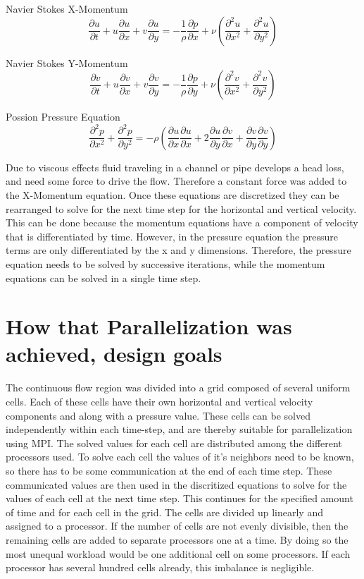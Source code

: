\documentclass[12pt]{article}
\begin{document}
Navier Stokes X-Momentum
$$\frac{\partial u}{\partial t}+u\frac{\partial u}{\partial x}+v\frac{\partial u}{\partial y}=-\frac{1}{\rho}\frac{\partial p}{\partial x}+\nu\left(\frac{\partial^2 u}{\partial x^2}+\frac{\partial^2 u}{\partial y^2}\right)$$

Navier Stokes Y-Momentum
$$\frac{\partial v}{\partial t}+u\frac{\partial v}{\partial x}+v\frac{\partial v}{\partial y}=-\frac{1}{\rho}\frac{\partial p}{\partial y}+\nu\left(\frac{\partial^2 v}{\partial x^2}+\frac{\partial^2 v}{\partial y^2}\right)$$

Possion Pressure Equation
$$\frac{\partial^2 p}{\partial x^2}+\frac{\partial^2 p}{\partial y^2}=-\rho\left(\frac{\partial u}{\partial x}\frac{\partial u}{\partial x}+2\frac{\partial u}{\partial y}\frac{\partial v}{\partial x}+\frac{\partial v}{\partial y}\frac{\partial v}{\partial y}\right)
$$

Due to viscous effects fluid traveling in a channel or pipe develops a head loss, and need some force to drive the 
flow. Therefore a constant force was added to the X-Momentum equation. Once these equations are discretized they can 
be rearranged to solve for the next time step for the horizontal and vertical velocity. This can be done because the 
momentum equations have a component of velocity that is differentiated by time. However, in the pressure equation the 
pressure terms are only differentiated by the x and y dimensions. Therefore, the pressure equation needs to be solved 
by successive iterations, while the momentum equations can be solved in a single time step.


\section{How that Parallelization was achieved, design goals}

The continuous flow region was divided into a grid composed of several uniform cells. Each of these cells have their 
own horizontal and vertical velocity components and along with a pressure value. These cells can be solved 
independently within each time-step, and are thereby suitable for parallelization using MPI. The solved values for 
each cell are distributed among the different processors used. To solve each cell the values of it's neighbors need 
to be known, so there has to be some communication at the end of each time step. These communicated values are then 
used in the discritized equations to solve for the values of each cell at the next time step. This continues for the 
specified amount of time and for each cell in the grid. The cells are divided up linearly and assigned to a processor. 
If the number of cells are not evenly divisible, then the remaining cells are added to separate processors one at a 
time. By doing so the most unequal workload would be one additional cell on some processors. If each processor has 
several hundred cells already, this imbalance is negligible.
\end{document}
